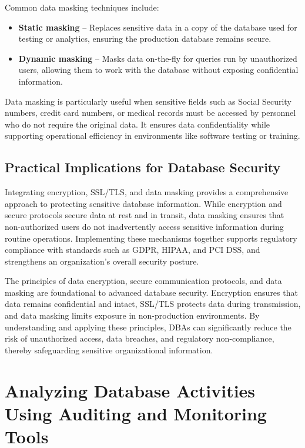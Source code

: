 \documentclass[12pt,a4paper]{article}
\begin{document}
Common data masking techniques include:

\begin{itemize}
  \item \textbf{Static masking} -- Replaces sensitive data in a copy of the database used for testing or analytics, ensuring the production database remains secure.
  \item \textbf{Dynamic masking} -- Masks data on-the-fly for queries run by unauthorized users, allowing them to work with the database without exposing confidential information.
\end{itemize}

Data masking is particularly useful when sensitive fields such as Social Security numbers, credit card numbers, or medical records must be accessed by personnel who do not require the original data. It ensures data confidentiality while supporting operational efficiency in environments like software testing or training.

\subsection{Practical Implications for Database Security}

Integrating encryption, SSL/TLS, and data masking provides a comprehensive approach to protecting sensitive database information. While encryption and secure protocols secure data at rest and in transit, data masking ensures that non-authorized users do not inadvertently access sensitive information during routine operations. Implementing these mechanisms together supports regulatory compliance with standards such as GDPR, HIPAA, and PCI DSS, and strengthens an organization's overall security posture.

\begin{conclusion}
The principles of data encryption, secure communication protocols, and data masking are foundational to advanced database security. Encryption ensures that data remains confidential and intact, SSL/TLS protects data during transmission, and data masking limits exposure in non-production environments. By understanding and applying these principles, DBAs can significantly reduce the risk of unauthorized access, data breaches, and regulatory non-compliance, thereby safeguarding sensitive organizational information.
\end{conclusion}


\section{Analyzing Database Activities Using Auditing and Monitoring Tools}
\end{document}
